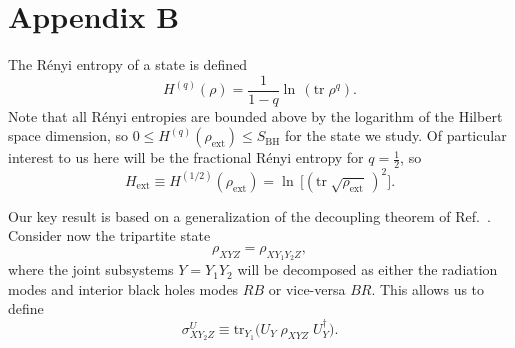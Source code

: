 \documentclass[12pt,aps,prl]{revtex4}
\begin{document}
\section{Appendix B}
\label{decoupling}

The R\'enyi entropy of a state is defined
\begin{equation}
H^{(q)}(\rho)=\frac{1}{1-q} \ln \,({\text{tr}}\; \rho^q).
\end{equation}
Note that all R\'enyi entropies are bounded above by the logarithm of
the Hilbert space dimension, so
 $0\le H^{(q)}(\rho_{\text{ext}})\le S_{\text{BH}}$
for the state we study. Of particular interest to us here will be the
fractional R\'enyi entropy for $q=\frac{1}{2}$, so
\begin{equation}
H_{\text{ext}} \equiv H^{(1/2)}(\rho_{\text{ext}})
=\ln \,\bigl[({\text{tr}}\;\sqrt{\rho_{\text{ext}}}\,)^2\bigr].
\end{equation}

Our key result is based on a generalization of the decoupling theorem of
Ref.~. Consider now the tripartite state
\begin{equation}
\rho_{XYZ}^{\text{~}}=
\rho_{XY_1Y_2Z}^{\text{~}},
\end{equation}
where the joint subsystems $Y=Y_1Y_2$ will be decomposed as either
the radiation modes and interior black holes modes $RB$ or vice-versa
$BR$. This allows us to define
\begin{equation}
\sigma_{XY_2Z}^U\equiv
\text{tr}_{Y_1}^{\text{~}} \bigl(U_{Y}\;
\rho_{XYZ}^{\text{~}}\; U_{Y}^\dagger\bigr).
\end{equation}
\end{document}
